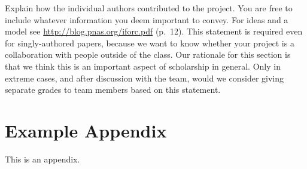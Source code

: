 \documentclass[11pt]{article}
\begin{document}
Explain how the individual authors contributed to the
project. You are free to include whatever information you deem important to convey. For ideas and a model see \url{http://blog.pnas.org/iforc.pdf} (p.~12).
This statement is required even for singly-authored papers, because we want to know whether your project is a collaboration with people outside of the class. Our rationale for this section is that we think this is an important aspect of scholarship in general. Only in extreme cases, and after discussion with the team, would we consider giving separate grades to team members based on this statement.



\appendix

\section{Example Appendix}\label{sec:appendix}

This is an appendix.
\end{document}
